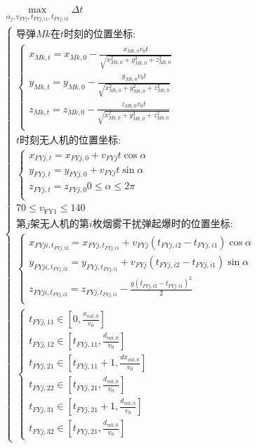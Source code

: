 \documentclass[../main.tex]{subfiles}
\begin{document}
\begin{align}
  \begin{array}{c}
	   \underset{\alpha _j,v_{FYj},t_{FYj,i1},t_{FYj,i2}}{\max}\Delta t\\
\left\{ \begin{array}{l}
\text{导弹$Mk$在$t$时刻的位置坐标:}\\
	\left\{ \begin{array}{l}
	x_{Mk,t}=x_{Mk,0}-\frac{x_{Mk,0}v_0t}{\sqrt{x_{Mk,0}^{2}+y_{Mk,0}^{2}+z_{Mk,0}^{2}}}\\
	y_{Mk,t}=y_{Mk,0}-\frac{y_{Mk,0}v_0t}{\sqrt{x_{Mk,0}^{2}+y_{Mk,0}^{2}+z_{Mk,0}^{2}}}\\
	z_{Mk,t}=z_{Mk,0}-\frac{z_{Mk,0}v_0t}{\sqrt{x_{Mk,0}^{2}+y_{Mk,0}^{2}+z_{Mk,0}^{2}}}\\
\end{array} \right. \\
	t\text{时刻无人机的位置坐标:}\\
	\begin{cases}
x_{FYj,t} = x_{FYj,0} + v_{FYj} t \cos\alpha \\
y_{FYj,t} = y_{FYj,0} + v_{FYj} t \sin\alpha \\
z_{FYj,t} = z_{FYj,0}
	0\leq \alpha \leq 2\pi\\
\end{cases}\\
  70 \leq v_{\text{FY1}} \leq 140\\
	\text{第$j$架无人机的第$i$枚烟雾干扰弹起爆时的位置坐标:}\\
	\left\{ \begin{array}{l}
	x_{FYji,t_{FYj,i2}}=x_{FYj,t_{FYj,i1}}+v_{FYj}\left( t_{FYj,i2}-t_{FYj,i1} \right) \cos \alpha\\
	y_{FYji,t_{FYj,i2}}=y_{FYj,t_{FYj,i1}}+v_{FYj}\left( t_{FYj,i2}-t_{FYj,i1} \right) \sin \alpha\\
	z_{FYji,t_{FYj,i2}}=z_{FYj,t_{FYj,i1}}-\frac{g\left( t_{FYj,i2}-t_{FYj,i1} \right) ^2}{2}\\
\end{array} \right.  \\
	\left\{ \begin{array}{l}
	t_{FYj,11}\in \left[ 0, \frac{x_{mk,0}}{v_0} \right]
	\\
	t_{FYj,12}\in \left[ t_{FYj,11}, \frac{d_{mk,0}}{v_0} \right]
	\\
	t_{FYj,21}\in \left[ t_{FYj,11}+1, \frac{dx_{mk,0}}{v_0} \right]
	\\
	t_{FYj,22}\in \left[ t_{FYj,21}, \frac{d_{mk,0}}{v_0} \right]
	\\
	t_{FYj,31}\in \left[ t_{FYj,21}+1, \frac{d_{mk,0}}{v_0} \right]
	\\
	t_{FYj,32}\in \left[ t_{FYj,21}, \frac{d_{mk,0}}{v_0} \right]
\end{array} \right. 
\end{array} \right.  
\end{array}
\end{align}
\end{document}
